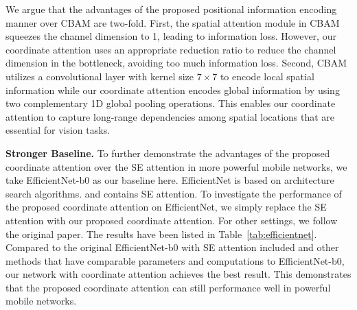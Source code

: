 \documentclass[final]{cvpr}
\newcommand{\myPara}[1]{\vspace{.05in}\noindent\textbf{#1.}}
\begin{document}
We argue that the advantages of the proposed
positional information encoding manner
over CBAM are two-fold.
%
First, the spatial attention module in CBAM
squeezes the channel dimension to 1, leading
to information loss.
%
However, our coordinate attention uses
an appropriate reduction ratio to 
reduce the channel dimension in the bottleneck,
avoiding too much information loss.
%
Second, CBAM utilizes a convolutional layer
with kernel size $7\times7$ to
encode local spatial information while our
coordinate attention encodes global information
by using two complementary 1D global pooling
operations.
%
This enables our coordinate attention to capture
long-range dependencies among spatial locations
that are essential for vision tasks.
%

\myPara{Stronger Baseline}
To further demonstrate the advantages of the proposed coordinate
attention over the SE attention in more powerful mobile networks,
we take EfficientNet-b0 \cite{tan2019efficientnet} 
as our baseline here.
%
EfficientNet is based on architecture search algorithms.
and contains SE attention.
%
To investigate the performance of the proposed coordinate attention
on EfficientNet, we simply replace the SE attention
with our proposed coordinate attention.
%
For other settings, we follow the original paper.
%
The results have been listed in Table~\ref{tab:efficientnet}.
%
Compared to the original EfficientNet-b0 with SE attention included and other methods that have comparable parameters and computations to EfficientNet-b0,
our network with coordinate attention achieves the best result.
%
This demonstrates that the proposed coordinate attention
can still performance well in powerful mobile networks.
\end{document}
